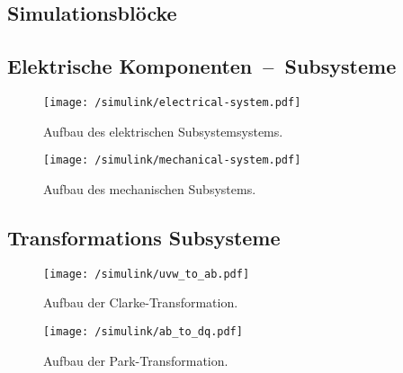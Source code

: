 \begin{appendix}
\chapter{Simulationsblöcke}
\section{Elektrische Komponenten~--~Subsysteme}
\begin{figure}[htb]
	\centering
	\texttt{[image: /simulink/electrical-system.pdf]}
	\label{fig:electrical-system}
	\caption{Aufbau des elektrischen Subsystemsystems.}
\end{figure}

\begin{figure}[htb]
\centering
\texttt{[image: /simulink/mechanical-system.pdf]}
\label{fig:mechanical-system}
\caption{Aufbau des mechanischen Subsystems.}
\end{figure}
\newpage
\section{Transformations Subsysteme}
\begin{figure}[h]
	\centering
	\texttt{[image: /simulink/uvw\_to\_ab.pdf]}
	\label{fig:uvw_to_ab}
	\caption{Aufbau der Clarke-Transformation.}
\end{figure}

\begin{figure}[h]
	\centering
	\texttt{[image: /simulink/ab\_to\_dq.pdf]}
	\label{fig:uvw_to_ab}
	\caption{Aufbau der Park-Transformation.}
\end{figure}


	
\end{appendix}

